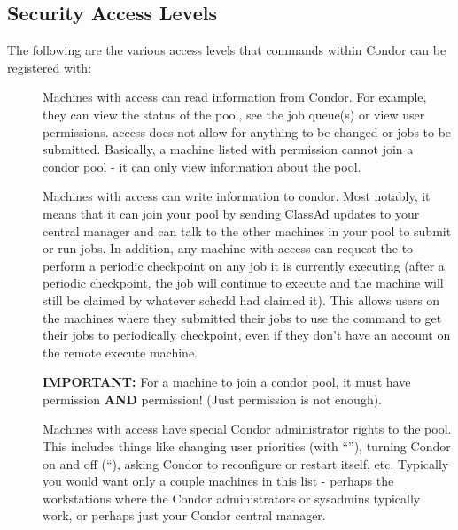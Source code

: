 \subsection{\label{sec:Security-Access-Levels}Security Access Levels} 

The following are the various access levels that commands within
Condor can be registered with:

\begin{description}

\item[] \label{dcperm:read} Machines with 
   access can read information from Condor.  For example, they can
   view the status of the pool, see the job queue(s) or view user
   permissions.   access does not allow for anything to
   be changed or jobs to be submitted.  Basically, a machine listed
   with  permission cannot join a condor pool - it can
   only view information about the pool.

\item[] \label{dcperm:write} Machines with
    access can write information to condor.  Most
   notably, it means that it can join your pool by sending ClassAd
   updates to your central manager and can talk to the other machines
   in your pool to submit or run jobs.  In addition, any machine with
    access can request the  to perform a
   periodic checkpoint on any job it is currently executing (after a
   periodic checkpoint, the job will continue to execute and the
   machine will still be claimed by whatever schedd had claimed it).
   This allows users on the machines where they submitted their jobs
   to use the  command to get their jobs to
   periodically checkpoint, even if they don't have an account on the
   remote execute machine.

   \textbf{IMPORTANT:} For a machine to join a condor pool, it must
   have  permission \textbf{AND}  permission!
   (Just  permission is not enough).

\item[] \label{dcperm:administrator} Machines
   with  access have special Condor
   administrator rights to the pool.  This includes things like
   changing user priorities (with ``''), turning
   Condor on and off (``), asking Condor to
   reconfigure or restart itself, etc.  Typically you would want only
   a couple machines in this list - perhaps the workstations where the
   Condor administrators or sysadmins typically work, or perhaps just
   your Condor central manager.


\end{description}
